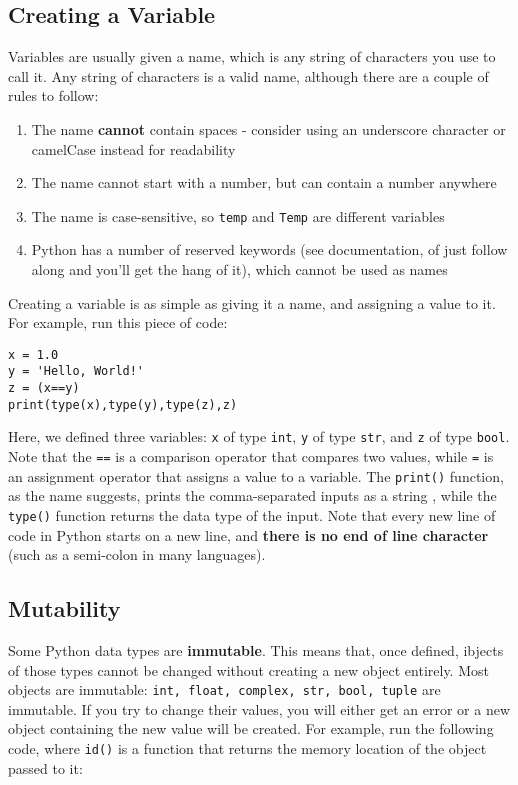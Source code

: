 \documentclass[12pt]{article}
\newcommand{\code}{\texttt}
\begin{document}
\subsection{Creating a Variable}
Variables are usually given a name, which is any string of characters you use to call it. Any string of characters is a valid name, although there are a couple of rules to follow:

\begin{enumerate}
	\item The name \textbf{cannot} contain spaces - consider using an underscore character or camelCase instead for readability
	\item The name cannot start with a number, but can contain a number anywhere
	\item The name is case-sensitive, so \code{temp} and \code{Temp} are different variables
	\item Python has a number of reserved keywords (see documentation, of just follow along and you'll get the hang of it), which cannot be used as names
\end{enumerate}

Creating a variable is as simple as giving it a name, and assigning a value to it. For example, run this piece of code:

\begin{lstlisting}[frame=single] 
x = 1.0
y = 'Hello, World!'
z = (x==y)
print(type(x),type(y),type(z),z)
\end{lstlisting}

Here, we defined three variables: \code{x} of type \code{int}, \code{y} of type \code{str}, and \code{z} of type \code{bool}. Note that the \code{==} is a comparison operator that compares two values, while \code{=} is an assignment operator that assigns a value to a variable. The \code{print()} function, as the name suggests, prints the comma-separated inputs as a string , while the \code{type()} function returns the data type of the input. Note that every new line of code in Python starts on a new line, and \textbf{there is no end of line character} (such as a semi-colon in many languages).

\subsection{Mutability}

Some Python data types are \textbf{immutable}. This means that, once defined, ibjects of those types cannot be changed without creating a new object entirely. Most objects are immutable: \code{int, float, complex, str, bool, tuple} are immutable. If you try to change their values, you will either get an error or a new object containing the new value will be created. For example, run the following code, where \code{id()} is a function that returns the memory location of the object passed to it:
\end{document}

